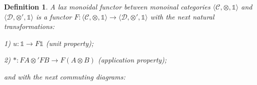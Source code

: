 \documentclass[a4paper]{article}
\newtheorem{defin}{Definition}
\begin{document}
\vspace{\baselineskip}

\begin{defin}
A lax monoidal functor between monoinal categories $\langle \mathcal{C}, \otimes, \mathds{1} \rangle$
and $\langle \mathcal{D}, \otimes', \mathds{1} \rangle$ is a functor $F : \langle \mathcal{C}, \otimes,
\mathds{1} \rangle \to \langle \mathcal{D}, \otimes', \mathds{1} \rangle$ with the next natural
transformations:

1) $u : \mathds{1} \to F \mathds{1}$ (unit property);

2) $\ast : F A \otimes' F B \to F (A \otimes B)$ (application property);

and with the next commuting diagrams:

\vspace{\baselineskip}



\end{defin}
\end{document}
